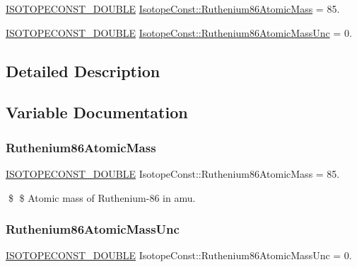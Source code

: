 \begin{DoxyCompactItemize}
\item 
\mbox{\hyperlink{group___isotope_const-_macros_ga8f45a7272ce02c0b4c65c44636ed719a}{I\+S\+O\+T\+O\+P\+E\+C\+O\+N\+S\+T\+\_\+\+D\+O\+U\+B\+LE}} \mbox{\hyperlink{group___isotope_const-_ruthenium-_ru86_ga583f01acedc3dc673146e6dc819aad49}{Isotope\+Const\+::\+Ruthenium86\+Atomic\+Mass}} = 85.
\item 
\mbox{\hyperlink{group___isotope_const-_macros_ga8f45a7272ce02c0b4c65c44636ed719a}{I\+S\+O\+T\+O\+P\+E\+C\+O\+N\+S\+T\+\_\+\+D\+O\+U\+B\+LE}} \mbox{\hyperlink{group___isotope_const-_ruthenium-_ru86_gaae90b55faa9588ce873ae1dca79c78c7}{Isotope\+Const\+::\+Ruthenium86\+Atomic\+Mass\+Unc}} = 0.
\end{DoxyCompactItemize}


\subsection{Detailed Description}


\subsection{Variable Documentation}
\mbox{\label{group___isotope_const-_ruthenium-_ru86_ga583f01acedc3dc673146e6dc819aad49}} 
\subsubsection{\texorpdfstring{Ruthenium86\+Atomic\+Mass}{Ruthenium86AtomicMass}}
{\footnotesize\ttfamily \mbox{\hyperlink{group___isotope_const-_macros_ga8f45a7272ce02c0b4c65c44636ed719a}{I\+S\+O\+T\+O\+P\+E\+C\+O\+N\+S\+T\+\_\+\+D\+O\+U\+B\+LE}} Isotope\+Const\+::\+Ruthenium86\+Atomic\+Mass = 85.}

\$ \$ Atomic mass of Ruthenium-\/86 in amu. \mbox{\label{group___isotope_const-_ruthenium-_ru86_gaae90b55faa9588ce873ae1dca79c78c7}} 
\subsubsection{\texorpdfstring{Ruthenium86\+Atomic\+Mass\+Unc}{Ruthenium86AtomicMassUnc}}
{\footnotesize\ttfamily \mbox{\hyperlink{group___isotope_const-_macros_ga8f45a7272ce02c0b4c65c44636ed719a}{I\+S\+O\+T\+O\+P\+E\+C\+O\+N\+S\+T\+\_\+\+D\+O\+U\+B\+LE}} Isotope\+Const\+::\+Ruthenium86\+Atomic\+Mass\+Unc = 0.}

